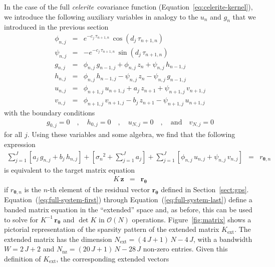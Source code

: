 \documentclass[manuscript, letterpaper]{aastex6}
\newcommand{\celeriteterm}{\emph{celerite}}
\newcommand{\figureref}[1]{\ref{fig:#1}}
\newcommand{\Figure}[1]{Figure~\figureref{#1}}
\renewcommand{\eqref}[1]{\ref{eq:#1}}
\newcommand{\Eq}[1]{Equation~(\eqref{#1})}
\newcommand{\eq}[1]{\Eq{#1}}
\newcommand{\eqalt}[1]{Equation~\eqref{#1}}
\newcommand{\eqlabel}[1]{\label{eq:#1}}
\newcommand{\sectionname}{Section}
\newcommand{\sectref}[1]{\ref{sect:#1}}
\newcommand{\Sect}[1]{\sectionname~\sectref{#1}}
\newcommand{\sect}[1]{\Sect{#1}}
\newcommand{\bvec}[1]{{\ensuremath{\boldsymbol{#1}}}}
\begin{document}
In the case of the full \celeriteterm\ covariance function
(\eqalt{celerite-kernel}), we introduce the following auxiliary variables in
analogy to the $u_n$ and $g_n$ that we introduced in the previous section
\begin{eqnarray}\eqlabel{full-system-first}
\phi_{n,j} &=& e^{-c_j\,\tau_{n+1,n}}\,\cos\left(d_j\,\tau_{n+1,n}\right)\\
\psi_{n,j} &=& -e^{-c_j\,\tau_{n+1,n}}\,\sin\left(d_j\,\tau_{n+1,n}\right)\\
g_{n,j} &=& \phi_{n,j}\,g_{n-1,j} + \phi_{n,j}\,z_n + \psi_{n,j}\,h_{n-1,j}\\
h_{n,j} &=& \phi_{n,j}\,h_{n-1,j} - \psi_{n,j}\,z_n - \psi_{n,j}\,g_{n-1,j}\\
u_{n,j} &=& \phi_{n+1,j}\,u_{n+1,j} + a_j\,z_{n+1} + \psi_{n+1,j}\,v_{n+1,j}\\
v_{n,j} &=& \phi_{n+1,j}\,v_{n+1,j} - b_j\,z_{n+1} - \psi_{n+1,j}\,u_{n+1,j}
\end{eqnarray}
with the boundary conditions
\begin{eqnarray}
    g_{0,j} = 0 \quad, \quad
    h_{0,j} = 0 \quad, \quad
    u_{N,j} = 0 \quad, \quad\mathrm{and}\quad
    v_{N,j} = 0
\end{eqnarray}
for all $j$.
Using these variables and some algebra, we find that the following expression
\begin{eqnarray}\eqlabel{full-system-last}
\sum_{j=1}^J \left[a_j\,g_{n,j}+b_j\,h_{n,j}\right]
+ \left[{\sigma_n}^2+\sum_{j=1}^J a_j\right]
+ \sum_{j=1}^J \left[\phi_{n,j}\,u_{n,j}+\psi_{n,j}\,v_{n,j}\right]
    &=& r_{\bvec{\theta},n}
\end{eqnarray}
is equivalent to the target matrix equation
\begin{eqnarray}
K\,\bvec{z} &=& \bvec{r}_\bvec{\theta}
\end{eqnarray}
if $r_{\bvec{\theta},n}$ is the $n$-th element of the residual vector
$\bvec{r}_\bvec{\theta}$ defined in \sect{gps}.
\eq{full-system-first} through \eq{full-system-last} define a banded matrix
equation in the ``extended'' space and, as before, this can be used to solve
for $K^{-1}\,\bvec{r}_\bvec{\theta}$ and $\det K$ in $\mathcal{O}(N)$
operations.
\Figure{matrix} shows a pictorial representation of the sparsity pattern of
the extended matrix $K_\mathrm{ext}$.
The extended matrix has the dimension $N_\mathrm{ext} = (4\,J+1)\,N-4\,J$,
with a bandwidth $W = 2\,J+2$ and $N_\mathrm{nz} = (20\,J+1)\,N-28\,J$
non-zero entries.
Given this definition of $K_\mathrm{ext}$, the corresponding extended vectors
\end{document}
